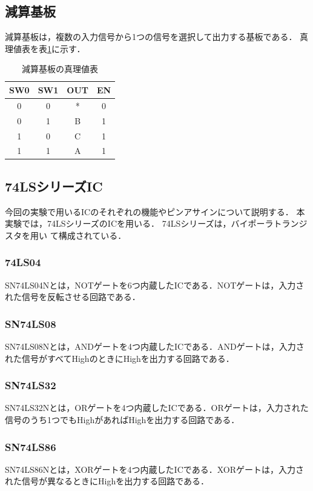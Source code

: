 \documentclass[a4paper,11pt,dvipdfmx]{jsarticle}
\begin{document}
\subsection{減算基板} \label{subsec:genzan}
減算基板は，複数の入力信号から1つの信号を選択して出力する基板である．
真理値表を表\ref{tab:selector}に示す．

\begin{table}[H]
  \caption{減算基板の真理値表}
  \centering
  \begin{tabular}{|cc|cc|}
    \hline
    SW0 & SW1 & OUT                     & EN \\
    \hline
    0   & 0   & * & 0  \\
    0   & 1   & B                       & 1  \\
    1   & 0   & C                       & 1  \\
    1   & 1   & A                       & 1  \\
    \hline
  \end{tabular}
  \label{tab:selector}
\end{table}

\subsection{74LSシリーズIC}
今回の実験で用いるICのそれぞれの機能やピンアサインについて説明する．
本実験では，74LSシリーズのICを用いる．
74LSシリーズは，バイポーラトランジスタを用い  て構成されている．

\subsubsection{74LS04}
SN74LS04Nとは，NOTゲートを6つ内蔵したICである．NOTゲートは，入力された信号を反転させる回路である．

\subsubsection{SN74LS08}
SN74LS08Nとは，ANDゲートを4つ内蔵したICである．ANDゲートは，入力された信号がすべてHighのときにHighを出力する回路である．

\subsubsection{SN74LS32}
SN74LS32Nとは，ORゲートを4つ内蔵したICである．ORゲートは，入力された信号のうち1つでもHighがあればHighを出力する回路である．

\subsubsection{SN74LS86}
SN74LS86Nとは，XORゲートを4つ内蔵したICである．XORゲートは，入力された信号が異なるときにHighを出力する回路である．
\end{document}
